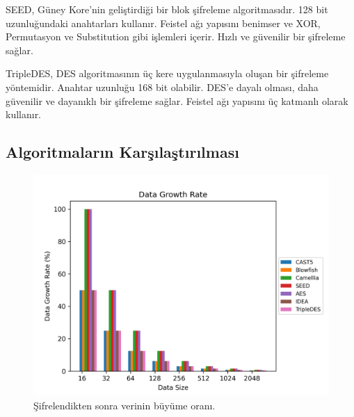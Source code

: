 \documentclass[conference, a4paper]{IEEEtran}
\begin{document}
    SEED, Güney Kore'nin geliştirdiği bir blok şifreleme algoritmasıdır. 128 bit uzunluğundaki anahtarları kullanır. Feistel ağı yapısını benimser ve XOR, Permutasyon ve Substitution gibi işlemleri içerir. Hızlı ve güvenilir bir şifreleme sağlar.

    TripleDES, DES algoritmasının üç kere uygulanmasıyla oluşan bir şifreleme yöntemidir. Anahtar uzunluğu 168 bit olabilir. DES'e dayalı olması, daha güvenilir ve dayanıklı bir şifreleme sağlar. Feistel ağı yapısını üç katmanlı olarak kullanır.

\subsection{Algoritmaların Karşılaştırılması}

    \begin{figure}[H]
    \centering
    \shorthandoff{=}  
    \includegraphics[scale=0.52]{fig4.png}
    \shorthandon{=} 
    \caption{Şifrelendikten sonra verinin büyüme oranı.}
    \label{sekil4}
    \end{figure}
\end{document}
